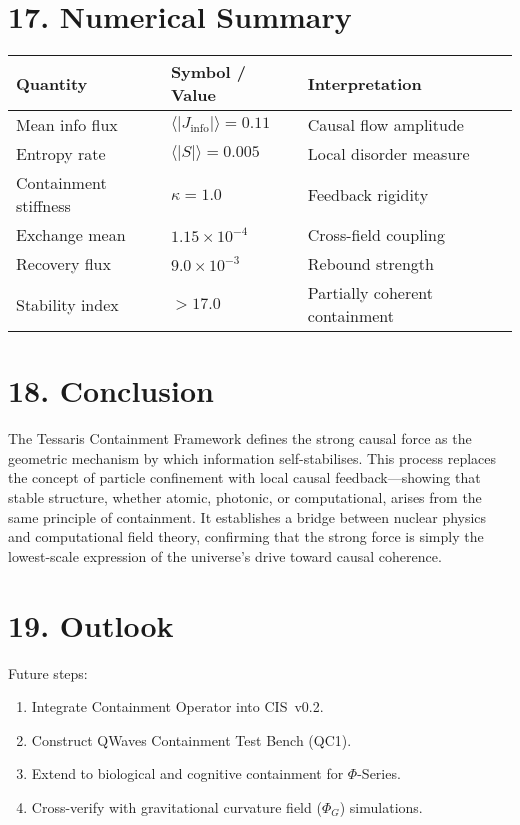 \documentclass[11pt,a4paper]{article}
\begin{document}
\section{17. Numerical Summary}
\begin{longtable}{|l|l|l|}
\hline
\textbf{Quantity} & \textbf{Symbol / Value} & \textbf{Interpretation} \\
\hline
Mean info flux & $\langle |J_{\mathrm{info}}| \rangle = 0.11$ & Causal flow amplitude \\
Entropy rate & $\langle |S| \rangle = 0.005$ & Local disorder measure \\
Containment stiffness & $\kappa = 1.0$ & Feedback rigidity \\
Exchange mean & $1.15\times10^{-4}$ & Cross-field coupling \\
Recovery flux & $9.0\times10^{-3}$ & Rebound strength \\
Stability index & $>17.0$ & Partially coherent containment \\
\hline
\end{longtable}

\section{18. Conclusion}
The Tessaris Containment Framework defines the strong causal force as the geometric mechanism by which information self-stabilises.  
This process replaces the concept of particle confinement with local causal feedback—showing that stable structure, whether atomic, photonic, or computational, arises from the same principle of containment.  
It establishes a bridge between nuclear physics and computational field theory, confirming that the strong force is simply the lowest-scale expression of the universe’s drive toward causal coherence.

\section{19. Outlook}
Future steps:
\begin{enumerate}
\item Integrate Containment Operator into CIS~v0.2.  
\item Construct QWaves Containment Test Bench (QC1).  
\item Extend to biological and cognitive containment for $\Phi$-Series.  
\item Cross-verify with gravitational curvature field ($\Phi_G$) simulations.  
\end{enumerate}
\end{document}

